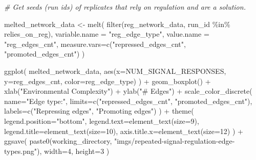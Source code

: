\documentclass[
]{book}
\newenvironment{Shaded}{\begin{snugshade}}{\end{snugshade}}
\newcommand{\AttributeTok}[1]{\textcolor[rgb]{0.77,0.63,0.00}{#1}}
\newcommand{\CommentTok}[1]{\textcolor[rgb]{0.56,0.35,0.01}{\textit{#1}}}
\newcommand{\DecValTok}[1]{\textcolor[rgb]{0.00,0.00,0.81}{#1}}
\newcommand{\FunctionTok}[1]{\textcolor[rgb]{0.00,0.00,0.00}{#1}}
\newcommand{\NormalTok}[1]{#1}
\newcommand{\OtherTok}[1]{\textcolor[rgb]{0.56,0.35,0.01}{#1}}
\newcommand{\SpecialCharTok}[1]{\textcolor[rgb]{0.00,0.00,0.00}{#1}}
\newcommand{\StringTok}[1]{\textcolor[rgb]{0.31,0.60,0.02}{#1}}
\begin{document}
\begin{Shaded}
\begin{Highlighting}[]
\CommentTok{\# Get seeds (run ids) of replicates that rely on regulation and are a solution.}

\NormalTok{melted\_network\_data }\OtherTok{\textless{}{-}} \FunctionTok{melt}\NormalTok{(}
  \FunctionTok{filter}\NormalTok{(reg\_network\_data, run\_id }\SpecialCharTok{\%in\%}\NormalTok{ relies\_on\_reg),}
  \AttributeTok{variable.name =} \StringTok{"reg\_edge\_type"}\NormalTok{,}
  \AttributeTok{value.name =} \StringTok{"reg\_edges\_cnt"}\NormalTok{,}
  \AttributeTok{measure.vars=}\FunctionTok{c}\NormalTok{(}\StringTok{"repressed\_edges\_cnt"}\NormalTok{, }\StringTok{"promoted\_edges\_cnt"}\NormalTok{)}
\NormalTok{)}

\FunctionTok{ggplot}\NormalTok{( melted\_network\_data, }\FunctionTok{aes}\NormalTok{(}\AttributeTok{x=}\NormalTok{NUM\_SIGNAL\_RESPONSES, }\AttributeTok{y=}\NormalTok{reg\_edges\_cnt, }\AttributeTok{color=}\NormalTok{reg\_edge\_type) ) }\SpecialCharTok{+}
  \FunctionTok{geom\_boxplot}\NormalTok{() }\SpecialCharTok{+}
  \FunctionTok{xlab}\NormalTok{(}\StringTok{"Environmental Complexity"}\NormalTok{) }\SpecialCharTok{+}
  \FunctionTok{ylab}\NormalTok{(}\StringTok{"\# Edges"}\NormalTok{) }\SpecialCharTok{+}
  \FunctionTok{scale\_color\_discrete}\NormalTok{(}
    \AttributeTok{name=}\StringTok{"Edge type:"}\NormalTok{,}
    \AttributeTok{limits=}\FunctionTok{c}\NormalTok{(}\StringTok{"repressed\_edges\_cnt"}\NormalTok{, }\StringTok{"promoted\_edges\_cnt"}\NormalTok{),}
    \AttributeTok{labels=}\FunctionTok{c}\NormalTok{(}\StringTok{"Repressing edges"}\NormalTok{, }\StringTok{"Promoting edges"}\NormalTok{)}
\NormalTok{  ) }\SpecialCharTok{+}
  \FunctionTok{theme}\NormalTok{(}
    \AttributeTok{legend.position=}\StringTok{"bottom"}\NormalTok{,}
    \AttributeTok{legend.text=}\FunctionTok{element\_text}\NormalTok{(}\AttributeTok{size=}\DecValTok{9}\NormalTok{),}
    \AttributeTok{legend.title=}\FunctionTok{element\_text}\NormalTok{(}\AttributeTok{size=}\DecValTok{10}\NormalTok{),}
    \AttributeTok{axis.title.x=}\FunctionTok{element\_text}\NormalTok{(}\AttributeTok{size=}\DecValTok{12}\NormalTok{)}
\NormalTok{  ) }\SpecialCharTok{+}
  \FunctionTok{ggsave}\NormalTok{(}
    \FunctionTok{paste0}\NormalTok{(working\_directory, }\StringTok{"imgs/repeated{-}signal{-}regulation{-}edge{-}types.png"}\NormalTok{),}
    \AttributeTok{width=}\DecValTok{4}\NormalTok{,}
    \AttributeTok{height=}\DecValTok{3}
\NormalTok{  )}
\end{Highlighting}
\end{Shaded}
\end{document}
